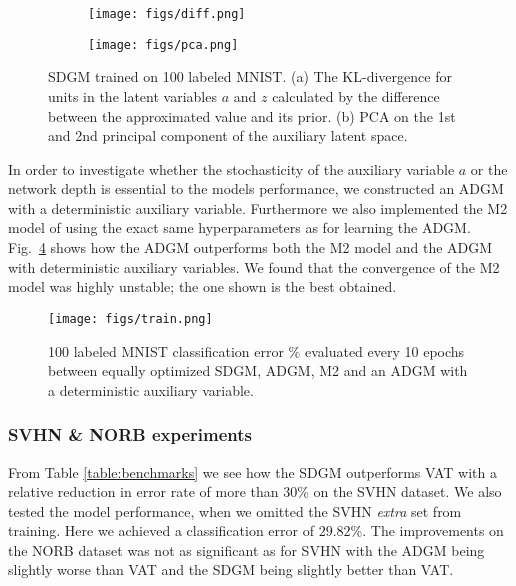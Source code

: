 \documentclass{article}
\begin{document}
\begin{figure}[h!]
\centering
\begin{subfigure}{.4\textwidth}
\centering
\texttt{[image: figs/diff.png]}
\caption{ }
\label{fig:kl}
\end{subfigure}
\begin{subfigure}{.4\textwidth}
\centering
\texttt{[image: figs/pca.png]}
\caption{ }
\label{fig:pca}
\end{subfigure}
 \vspace{-2mm}
\caption{SDGM trained on 100 labeled MNIST. (a) The KL-divergence for units in the latent variables $a$ and $z$ calculated by the difference between the approximated value and its prior. (b) PCA on the 1st and 2nd principal component of the auxiliary latent space.}
\end{figure}

In order to investigate whether the stochasticity of the auxiliary variable $a$ or the network depth is essential to the models performance, we constructed an ADGM with a deterministic auxiliary variable. Furthermore we also implemented the M2 model of \citet{Kingma14} using the exact same hyperparameters as for learning the ADGM. Fig.~\ref{fig:curve} shows how the ADGM outperforms both the M2 model and the ADGM with deterministic auxiliary variables. We found that the convergence of the M2 model was highly unstable; the one shown is the best obtained.
\begin{figure}
\vspace{-3mm}
	  \centering
      \texttt{[image: figs/train.png]}
       \vspace{-3mm}
	  \caption{100 labeled MNIST classification error $\%$ evaluated every 10 epochs between equally optimized SDGM, ADGM, M2 \citep{Kingma14} and an ADGM with a deterministic auxiliary variable.}
	  \label{fig:curve}
      \vspace{-5mm}
\end{figure}



\subsubsection*{SVHN \& NORB experiments}
From Table \ref{table:benchmarks} we see how the SDGM outperforms VAT with a relative reduction in error rate of more than $30$\% on the SVHN dataset. We also tested the model performance, when we omitted the SVHN \textit{extra} set from training. Here we achieved a classification error of $29.82$\%. The improvements on the NORB dataset was not as significant as for SVHN with the ADGM being slightly worse than VAT and the SDGM being slightly better than VAT.
\end{document}
